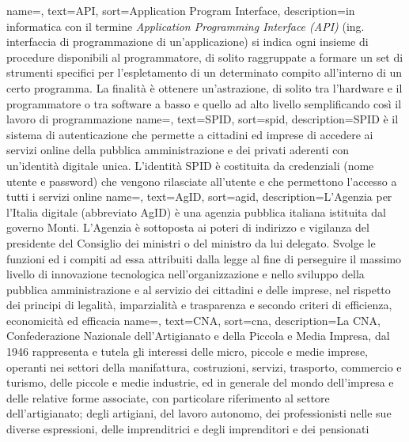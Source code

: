 
\renewcommand{\acronymname}{Acronimi e abbreviazioni}


\renewcommand{\glossaryname}{Glossario}

{
    name=,
    text=API,
    sort=Application Program Interface,
    description={in informatica con il termine \emph{Application Programming Interface (API)} (ing. interfaccia di programmazione di un'applicazione) si indica ogni insieme di procedure disponibili al programmatore, di solito raggruppate a formare un set di strumenti specifici per l'espletamento di un determinato compito all'interno di un certo programma. La finalità è ottenere un'astrazione, di solito tra l'hardware e il programmatore o tra software a basso e quello ad alto livello semplificando così il lavoro di programmazione}
}
{
	name=,
	text=SPID,
	sort=spid,
	description={SPID è il sistema di autenticazione che permette a cittadini ed imprese di accedere ai servizi online della pubblica amministrazione e dei privati aderenti con un’identità digitale unica. L’identità SPID è costituita da credenziali (nome utente e password) che vengono rilasciate all’utente e che permettono l’accesso a tutti i servizi online}
}
{
	name=,
	text=AgID,
	sort=agid,
	description={L'Agenzia per l'Italia digitale (abbreviato AgID) è una agenzia pubblica italiana istituita dal governo Monti. L'Agenzia è sottoposta ai poteri di indirizzo e vigilanza del presidente del Consiglio dei ministri o del ministro da lui delegato. Svolge le funzioni ed i compiti ad essa attribuiti dalla legge al fine di perseguire il massimo livello di innovazione tecnologica nell'organizzazione e nello sviluppo della pubblica amministrazione e al servizio dei cittadini e delle imprese, nel rispetto dei principi di legalità, imparzialità e trasparenza e secondo criteri di efficienza, economicità ed efficacia}
}
{
	name=,
	text=CNA,
	sort=cna,
	description={La CNA, Confederazione Nazionale dell'Artigianato e della Piccola e Media Impresa, dal 1946 rappresenta e tutela gli interessi delle micro, piccole e medie imprese, operanti nei settori della manifattura, costruzioni, servizi, trasporto, commercio e turismo, delle piccole e medie industrie, ed in generale del mondo dell’impresa e delle relative forme associate, con particolare riferimento al settore dell’artigianato; degli artigiani, del lavoro autonomo, dei professionisti  nelle sue diverse espressioni, delle imprenditrici e degli imprenditori e dei pensionati}
}
